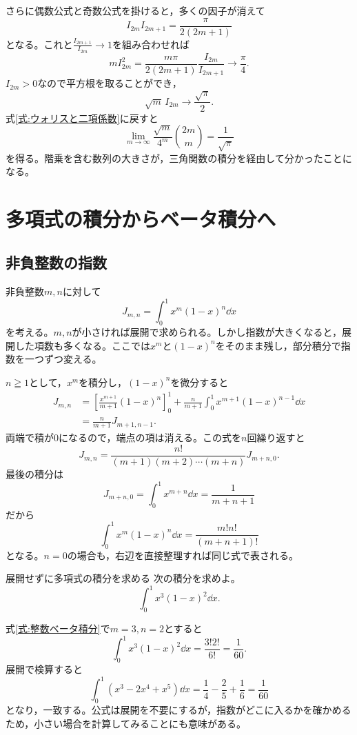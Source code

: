 さらに偶数公式と奇数公式を掛けると，多くの因子が消えて
\[
 I_{2m}I_{2m+1}=\frac{\pi}{2(2m+1)}
\]
となる。これと$\frac{I_{2m+1}}{I_{2m}}\to1$を組み合わせれば
\[
 mI_{2m}^2
 =\frac{m\pi}{2(2m+1)}\frac{I_{2m}}{I_{2m+1}}
 \longrightarrow\frac{\pi}{4}.
\]
$I_{2m}>0$なので平方根を取ることができ，
\[
 \sqrt m\,I_{2m}\longrightarrow\frac{\sqrt\pi}{2}.
\]
式\eqref{式:ウォリスと二項係数}に戻すと
\begin{equation}\label{式:中央二項係数の極限}
 \lim_{m\to\infty}\frac{\sqrt m}{4^m}\binom{2m}{m}
 =\frac1{\sqrt\pi}
\end{equation}
を得る。階乗を含む数列の大きさが，三角関数の積分を経由して分かったことになる。

\section{多項式の積分からベータ積分へ}\label{節:ベータ積分}

\subsection{非負整数の指数}

非負整数$m,n$に対して
\[
 J_{m,n}=\int_0^1x^m(1-x)^n\dd x
\]
を考える。$m,n$が小さければ展開で求められる。しかし指数が大きくなると，展開した項数も多くなる。ここでは$x^m$と$(1-x)^n$をそのまま残し，部分積分で指数を一つずつ変える。

$n\geqq1$として，$x^m$を積分し，$(1-x)^n$を微分すると
\begin{align*}
 J_{m,n}
 &=\left[\frac{x^{m+1}}{m+1}(1-x)^n\right]_0^1
   +\frac{n}{m+1}\int_0^1x^{m+1}(1-x)^{n-1}\dd x\\
 &=\frac{n}{m+1}J_{m+1,n-1}.
\end{align*}
両端で積が$0$になるので，端点の項は消える。この式を$n$回繰り返すと
\[
 J_{m,n}
 =\frac{n!}{(m+1)(m+2)\cdots(m+n)}J_{m+n,0}.
\]
最後の積分は
\[
 J_{m+n,0}=\int_0^1x^{m+n}\dd x=\frac1{m+n+1}
\]
だから
\begin{equation}\label{式:整数ベータ積分}
 \boxed{\displaystyle
 \int_0^1x^m(1-x)^n\dd x=\frac{m!n!}{(m+n+1)!}}
\end{equation}
となる。$n=0$の場合も，右辺を直接整理すれば同じ式で表される。

\begin{example}{展開せずに多項式の積分を求める}
次の積分を求めよ。
\[
 \int_0^1x^3(1-x)^2\dd x.
\]
\end{example}

式\eqref{式:整数ベータ積分}で$m=3,n=2$とすると
\[
 \int_0^1x^3(1-x)^2\dd x
 =\frac{3!2!}{6!}=\frac1{60}.
\]
展開で検算すると
\[
 \int_0^1(x^3-2x^4+x^5)\dd x
 =\frac14-\frac25+\frac16=\frac1{60}
\]
となり，一致する。公式は展開を不要にするが，指数がどこに入るかを確かめるため，小さい場合を計算してみることにも意味がある。

